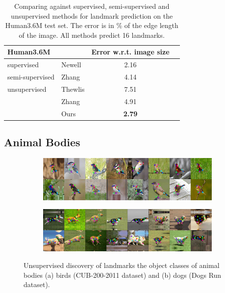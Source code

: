 			\begin{table}[htp]
				\caption{{Comparing against supervised, semi-supervised and unsupervised methods for landmark prediction on the Human3.6M test set. The
				error is in \% of the edge length of the image. All methods predict 16 landmarks.
				}}
				\label{tab:human}
				\centering
				\begin{tabular}{ll|cr}
				\hline
				 Human3.6M   & &  { Error w.r.t. image size}  \\
				 \hline
				 supervised & Newell \cite{newell16hourglass}
				  &2.16  \\  \hline
				 semi-supervised & Zhang \cite{zhang18}
				  & 4.14  \\ \hline
				 unsupervised & Thewlis \cite{thewlis17}
				 & 7.51  \\
				  & Zhang \cite{zhang18}
					& 4.91 \\
				  & Ours& \textbf{2.79} \\
				\hline
				\end{tabular}
			\end{table}




	\subsection{Animal Bodies}\label{sec:kp_animalbodies}
		\begin{figure}[htp]
			\centering
			\begin{subfigure}{1.\textwidth}
			\includegraphics[trim={0cm 0cm 0cm 0cm},clip, width=1.\linewidth]{fig/shape/0birds}\caption{}
			\end{subfigure}
			\begin{subfigure}{1.\textwidth}
			\includegraphics[trim={0cm 0cm 0cm 0cm},clip, width=1.\linewidth]{fig/shape/0dogs}\caption{}
			\end{subfigure}
			\caption{{Unsupervised discovery of landmarks the object classes of animal bodies (a) birds (CUB-200-2011 dataset) and (b) dogs (Dogs Run dataset).}}
			\label{fig:kp_animals}
		\end{figure}


